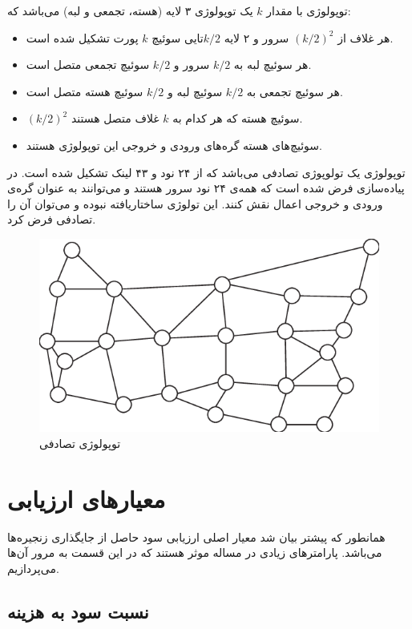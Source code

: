 توپولوژی  با مقدار \(k\) یک توپولوژی ۳ لایه (هسته، تجمعی و لبه) می‌باشد که:
\begin{itemize}
    \item هر غلاف از \((k/2)^2\) سرور و ۲ لایه \(k/2\)تایی سوئیچ \(k\) پورت تشکیل شده است.
    \item هر سوئیچ لبه به \(k/2\) سرور و \(k/2\) سوئیچ تجمعی متصل است.
    \item هر سوئیچ تجمعی به \(k/2\) سوئیچ لبه و \(k/2\) سوئیچ هسته متصل است.
    \item \((k/2)^2\) سوئیچ هسته که هر کدام به \(k\) غلاف متصل هستند.
    \item سوئیچ‌های هسته گره‌های ورودی و خروجی این توپولوژی هستند.
\end{itemize}

توپولوژی  یک تولوپوژی تصادفی می‌باشد که از ۲۴ نود و ۴۳ لینک تشکیل شده است.
در پیاده‌سازی فرض شده است که همه‌ی ۲۴ نود سرور هستند و می‌توانند به عنوان گره‌ی ورودی و خروجی اعمال نقش کنند.
این تولوژی ساختاریافته نبوده و می‌توان آن را تصادفی فرض کرد.

\begin{figure}[!h]
\center\includegraphics[scale=.5]{images/usnet}
\caption{توپولوژی تصادفی }
\label{fig.3}
\end{figure}

\section{معیار‌های ارزیابی}

همانطور که پیشتر بیان شد معیار اصلی ارزیابی سود حاصل از جایگذاری زنجیره‌ها می‌باشد.
پارامترهای زیادی در مساله موثر هستند که در این قسمت به مرور آن‌ها می‌پردازیم.

\subsection{نسبت سود به هزینه}

